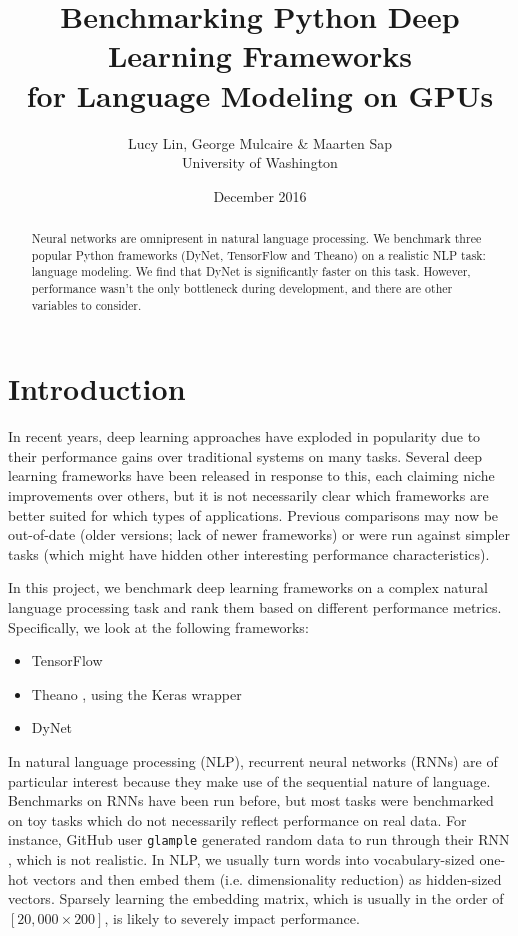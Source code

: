 \documentclass{article}
\title{Benchmarking Python Deep Learning Frameworks\\ for Language Modeling on GPUs}
\author{Lucy Lin, George Mulcaire \& Maarten Sap
\\University of Washington}
\date{December 2016}
\begin{document}
\maketitle

\begin{abstract}
Neural networks are omnipresent in natural language processing. 
We benchmark three popular Python frameworks (DyNet, TensorFlow and Theano) on a realistic NLP task: language modeling.
We find that DyNet is significantly faster on this task. However, performance wasn't the only bottleneck during development, and there are other variables to consider.
\end{abstract}


\section{Introduction}
In recent years, deep learning approaches have exploded in popularity due to their performance gains over traditional systems on many tasks. Several deep learning frameworks have been released in response to this, each claiming niche improvements over others, but it is not necessarily clear which frameworks are better suited for which types of applications. Previous comparisons may now be out-of-date (older versions; lack of newer frameworks) or were run against simpler tasks (which might have hidden other interesting performance characteristics).

In this project, we benchmark deep learning frameworks on a complex natural language processing task and rank them based on different performance metrics. Specifically, we look at the following frameworks:
\begin{itemize}
	\item TensorFlow \cite{tensorflow}
	\item Theano \cite{theano}, using the Keras wrapper \cite{keras}
	\item DyNet \cite{dynet}
\end{itemize}
In natural language processing (NLP), recurrent neural networks (RNNs) are of particular interest because they make use of the sequential nature of language. Benchmarks on RNNs have been run before, but most tasks were benchmarked on toy tasks which do not necessarily reflect performance on real data. For instance, GitHub user \verb!glample! generated random data to run through their RNN \cite{glample}, which is not realistic. In NLP, we usually turn words into vocabulary-sized one-hot vectors and then embed them (i.e. dimensionality reduction) as hidden-sized vectors. Sparsely learning the embedding matrix, which is usually in the order of $[20,000 \times 200]$, is likely to severely impact performance.
\end{document}
